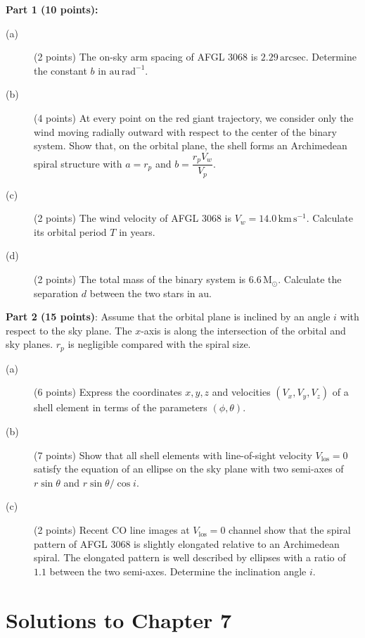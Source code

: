 
\medskip\noindent\textbf{Part 1 (10 points):}

\begin{description}
\item[(a)] (2 points) The on-sky arm spacing of AFGL 3068 is
  $2.29\,\mathrm{arcsec}$. Determine the constant $b$ in
  $\mathrm{au\,rad^{-1}}$.
\item[(b)] (4 points) At every point on the red giant trajectory, we consider
  only the wind moving radially outward with respect to the center of the
  binary system. Show that, on the orbital plane, the shell forms an
  Archimedean spiral structure with $a = r_p$ and $b = \dfrac{r_p V_w}{V_p}$.
\item[(c)] (2 points) The wind velocity of AFGL 3068 is
  $V_w = 14.0\,\mathrm{km\,s^{-1}}$. Calculate its orbital period $T$ in
  years.
\item[(d)] (2 points) The total mass of the binary system is
  $6.6\,\mathrm{M}_\odot$. Calculate the separation $d$ between the two stars
  in $\mathrm{au}$.
\end{description}

\medskip\noindent\textbf{Part 2 (15 points)}: Assume that the orbital plane is
inclined by an angle $i$ with respect to the sky plane. The $x$-axis is along
the intersection of the orbital and sky planes. $r_p$ is negligible compared
with the spiral size.

\begin{description}
\item[(a)] (6 points) Express the coordinates $x, y, z$ and velocities
  $(V_x, V_y, V_z)$ of a shell element in terms of the parameters
  $(\phi, \theta)$.
\item[(b)] (7 points) Show that all shell elements with line-of-sight velocity
  $V_{\mathrm{los}} = 0$ satisfy the equation of an ellipse on the sky plane
  with two semi-axes of $r\sin\theta$ and $r\sin\theta/\cos i$.
\item[(c)] (2 points) Recent CO line images at $V_{\mathrm{los}} = 0$ channel
  show that the spiral pattern of AFGL 3068 is slightly elongated relative to
  an Archimedean spiral. The elongated pattern is well described by ellipses
  with a ratio of $1.1$ between the two semi-axes. Determine the inclination
  angle $i$.
\end{description}

\clearpage
\section*{Solutions to Chapter 7}

